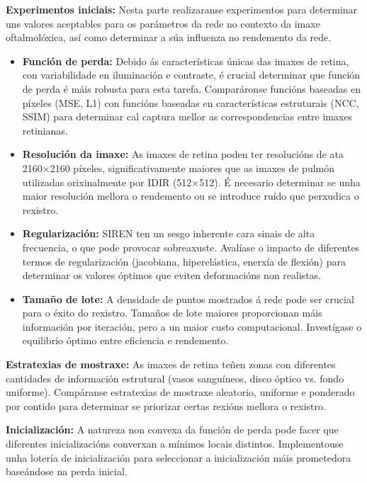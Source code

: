 
\textbf{Experimentos iniciais:} Nesta parte realizaranse experimentos para determinar uns valores aceptables para os parámetros da rede no contexto da imaxe oftalmolóxica, 
así como determinar a súa influenza no rendemento da rede.

\begin{itemize}
    \item \textbf{Función de perda:} Debido ás características únicas das imaxes de retina, con variabilidade en iluminación e contraste, é crucial determinar que función de perda é máis robusta para esta tarefa. Comparáronse funcións baseadas en píxeles (MSE, L1) con funcións baseadas en características estruturais (NCC, SSIM) para determinar cal captura mellor as correspondencias entre imaxes retinianas.
    \item \textbf{Resolución da imaxe:} As imaxes de retina poden ter resolucións de ata 2160×2160 píxeles, significativamente maiores que as imaxes de pulmón utilizadas orixinalmente por IDIR (512×512). É necesario determinar se unha maior resolución mellora o rendemento ou se introduce ruído que perxudica o rexistro.
    \item \textbf{Regularización:} SIREN ten un sesgo inherente cara sinais de alta frecuencia, o que pode provocar sobreaxuste. Avalíase o impacto de diferentes termos de regularización (jacobiana, hiperelástica, enerxía de flexión) para determinar os valores óptimos que eviten deformacións non realistas.
    \item \textbf{Tamaño de lote:} A densidade de puntos mostrados á rede pode ser crucial para o éxito do rexistro. Tamaños de lote maiores proporcionan máis información por iteración, pero a un maior custo computacional. Investígase o equilibrio óptimo entre eficiencia e rendemento.
\end{itemize}

\textbf{Estratexias de mostraxe:} As imaxes de retina teñen zonas con diferentes cantidades de información estrutural (vasos sanguíneos, disco óptico vs. fondo uniforme). Compáranse estratexias de mostraxe aleatorio, uniforme e ponderado por contido para determinar se priorizar certas rexións mellora o rexistro.

\textbf{Inicialización:} A natureza non convexa da función de perda pode facer que diferentes inicializacións converxan a mínimos locais distintos. Implementouse unha lotería de inicialización para seleccionar a inicialización máis prometedora baseándose na perda inicial.

